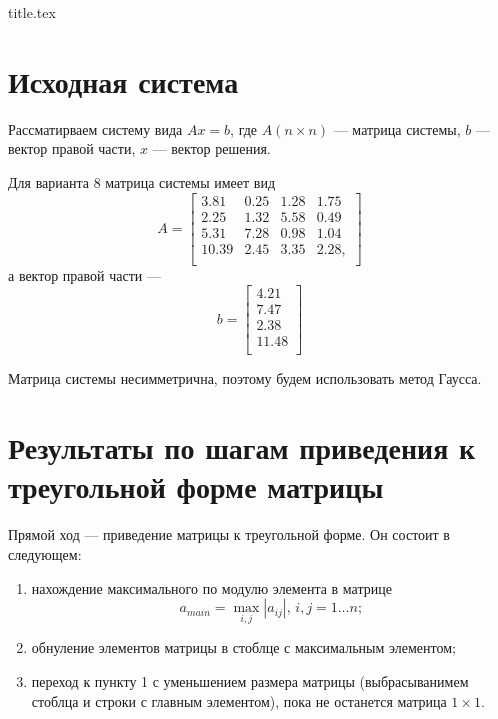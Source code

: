 




{title.tex}

\clearpage


\pagestyle{empty}
\thispagestyle{empty}
\tableofcontents

\clearpage
{}
\pagestyle{fancy}
\setcounter{page}{2}

\clearpage

\chapter{Исходная система}

Рассматирваем систему вида $Ax = b$, где $A \left( n \times n \right) $ --- матрица системы, $b$ ---
вектор правой части, $x$ --- вектор решения.

Для варианта 8 матрица системы имеет вид
\begin{equation*}
A =
\begin{bmatrix}
    3.81 & 0.25 & 1.28 & 1.75 \\
    2.25 & 1.32 & 5.58 & 0.49 \\
    5.31 & 7.28 & 0.98 & 1.04 \\
    10.39 & 2.45 & 3.35 & 2.28, \\
\end{bmatrix}
\end{equation*}
а вектор правой части ---
\begin{equation*}
b =
\begin{bmatrix}
    4.21 \\
    7.47 \\
    2.38 \\
    11.48 \\
\end{bmatrix}
\end{equation*}

Матрица системы несимметрична, поэтому будем использовать метод Гаусса.

\chapter{Результаты по шагам приведения к треугольной форме матрицы}

Прямой ход --- приведение матрицы к треугольной форме.
Он состоит в следующем:
\begin{enumerate}
  \item нахождение максимального по модулю элемента в матрице
  $$a_{main} = \max_{i, j} \left| a_{ij} \right|, \,
    i, j = 1 \dotsc n;$$
  \item обнуление элементов матрицы в стоблце с максимальным элементом;
  \item переход к пункту 1 с уменьшением размера матрицы
  (выбрасыванимем стоблца и строки с главным элементом), пока не останется матрица $1 \times 1$.
\end{enumerate}

